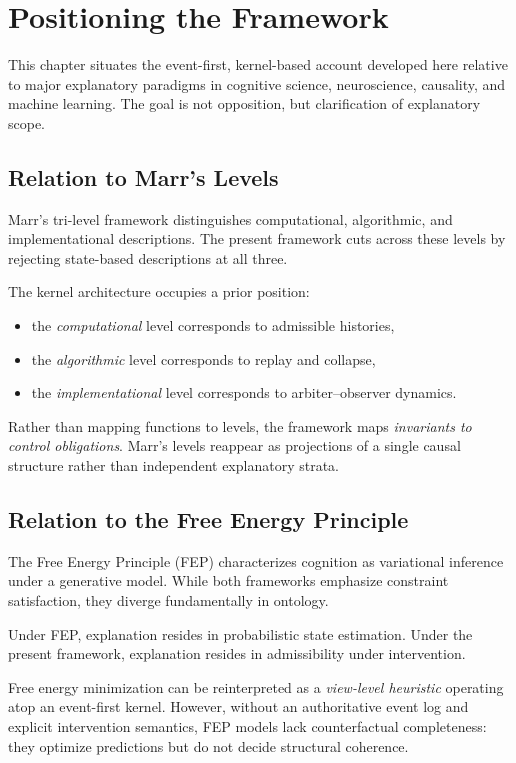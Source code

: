 \documentclass[11pt]{article}
\begin{document}
\chapter{Positioning the Framework}
\label{ch:positioning}

This chapter situates the event-first, kernel-based account developed here relative to major explanatory paradigms in cognitive science, neuroscience, causality, and machine learning. The goal is not opposition, but clarification of explanatory scope.

\section{Relation to Marr’s Levels}

Marr’s tri-level framework distinguishes computational, algorithmic, and implementational descriptions. The present framework cuts across these levels by rejecting state-based descriptions at all three.

The kernel architecture occupies a prior position:
\begin{itemize}
  \item the \emph{computational} level corresponds to admissible histories,
  \item the \emph{algorithmic} level corresponds to replay and collapse,
  \item the \emph{implementational} level corresponds to arbiter–observer dynamics.
\end{itemize}

Rather than mapping functions to levels, the framework maps \emph{invariants to control obligations}. Marr’s levels reappear as projections of a single causal structure rather than independent explanatory strata.

\section{Relation to the Free Energy Principle}

The Free Energy Principle (FEP) characterizes cognition as variational inference under a generative model. While both frameworks emphasize constraint satisfaction, they diverge fundamentally in ontology.

Under FEP, explanation resides in probabilistic state estimation. Under the present framework, explanation resides in admissibility under intervention.

Free energy minimization can be reinterpreted as a \emph{view-level heuristic} operating atop an event-first kernel. However, without an authoritative event log and explicit intervention semantics, FEP models lack counterfactual completeness: they optimize predictions but do not decide structural coherence.
\end{document}
